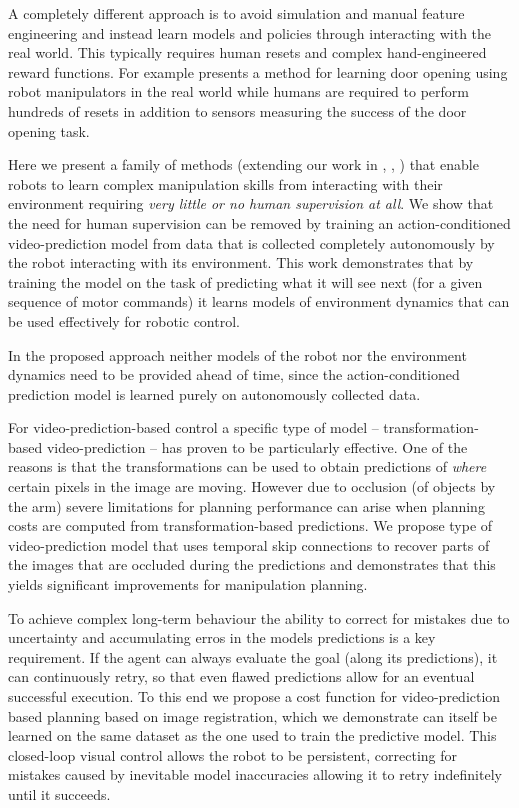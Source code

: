 A completely different approach is to avoid simulation and manual feature engineering and instead learn models and policies through interacting with the real world. This typically requires human resets and complex hand-engineered reward functions. For example \cite{DBLP:journals/corr/GuHLL16} presents a method for learning door opening using robot manipulators in the real world while humans are required to perform hundreds of resets in addition to sensors measuring the success of the door opening task.

Here we present a family of methods (extending our work in \cite{foresight}, \cite{sna}, ) that enable robots to learn complex manipulation skills from interacting with their environment requiring \emph{very little or no human supervision at all}. We show that the need for human supervision can be removed by training an action-conditioned video-prediction model from data that is collected completely autonomously by the robot interacting with its environment. This work demonstrates that by training the model on the task of predicting what it will see next (for a given sequence of motor commands) it learns models of environment dynamics that can be used effectively for robotic control.

In the proposed approach neither models of the robot nor the environment dynamics need to be provided ahead of time, since the action-conditioned prediction model is learned purely on autonomously collected data.

For video-prediction-based control a specific type of model -- transformation-based video-prediction -- has proven to be particularly effective. One of the reasons is that the transformations can be used to obtain predictions of \emph{where} certain pixels in the image are moving. However due to occlusion (of objects by the arm) severe limitations for planning performance can arise when planning costs are computed from transformation-based predictions. We propose type of video-prediction model that uses temporal skip connections to recover parts of the images that are occluded during the predictions and demonstrates that this yields significant improvements for manipulation planning.
\fi


\iffalse


To achieve complex long-term behaviour the ability to correct for mistakes due to uncertainty and accumulating erros in the models predictions is a key requirement. If the agent can always evaluate the goal (along its predictions), it can continuously retry, so that even flawed predictions allow for an eventual successful execution. To this end we propose a cost function for video-prediction based planning based on image registration, which we demonstrate can itself be learned on the same dataset as the one used to train the predictive model. This closed-loop visual control allows the robot to be persistent, correcting for mistakes caused by inevitable model inaccuracies allowing it to retry indefinitely until it succeeds.

